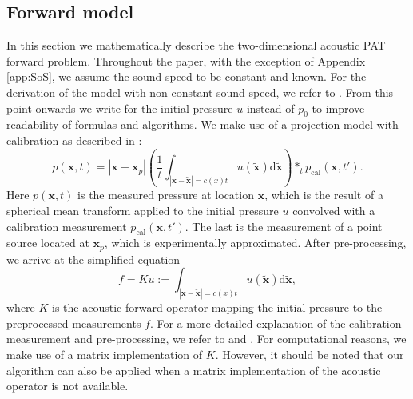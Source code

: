 \documentclass[journal]{IEEEtran}
\newcommand{\hl}[1]{#1}
\begin{document}
\subsection{Forward model}\label{sec:fw_model}
In this section we mathematically describe the {two-dimensional} acoustic PAT forward problem. {Throughout the paper, with the exception of Appendix \ref{app:SoS}, we assume the sound speed to be constant and known. For the derivation of the model with non-constant sound speed, we refer to \cite[section 5.3]{Willemink2010}.} From this point onwards we write for the initial pressure $u$ instead of $p_0$ to improve readability of formulas and algorithms. We make use of a projection model with calibration as described in \cite{Wang2004}:
{\begin{equation}\label{eq:FW_full}
p(\mathbf{x},t) = |\mathbf{x}-\mathbf{x}_p|\left(\frac{1}{t}\int_{|\mathbf{x}-\tilde{\mathbf{x}}|=c(x)t} u(\tilde{\mathbf{x}})\text{d} \tilde{\mathbf{x}}\right)\ast_t p_\text{cal}\left(\mathbf{x},t'\right).
\end{equation}}
Here $p(\mathbf{x},t)$ is the measured pressure at location $\mathbf{x}$, which is the result of a spherical mean transform \cite{Kruger1995} applied to the initial pressure $u$ convolved with a calibration measurement $p_\text{cal}\left(\mathbf{x},t'\right)$. The last is the measurement of a point source located at $\mathbf{x}_p$, which is experimentally approximated. After pre-processing, we arrive at the simplified equation 
{\begin{equation}\label{eq:FW_prep}
f = Ku:=\int_{|\mathbf{x}-\tilde{\mathbf{x}}|=c(x)t} u(\tilde{\mathbf{x}})\text{d} \tilde{\mathbf{x}},
\end{equation}}
where $K$ is the acoustic forward operator mapping the initial pressure to the preprocessed measurements $f$. For a more detailed explanation of the calibration measurement and pre-processing, we refer to \cite[Chapter 2]{Willemink2010} and \cite{Boink2018}. \hl{For computational reasons, we make use of a matrix implementation of $K$. However, it should be noted that our algorithm can also be applied when a matrix implementation of the acoustic operator is not available.}
\end{document}
